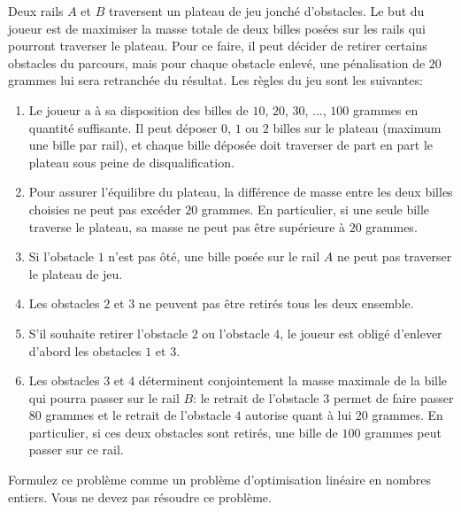 \begin{enumerate}
    Deux rails $A$ et $B$ traversent un plateau de jeu jonché
    d'obstacles.  Le but du joueur est de maximiser la masse
    totale
    de deux billes posées sur les rails qui pourront traverser le plateau.
    Pour ce faire, il peut décider de retirer
    certains obstacles du parcours, mais pour chaque obstacle
    enlevé, une pénalisation de $20$ grammes lui sera retranchée du résultat.
    Les règles du jeu sont les suivantes:
    \begin{enumerate}
      \item Le joueur a à sa disposition des billes de $10$,
        $20$, $30$, ..., $100$ grammes en quantité suffisante.  Il
        peut déposer $0$, $1$ ou $2$ billes sur le plateau
        (maximum une bille par rail), et chaque bille déposée doit
        traverser de part en part le plateau sous peine de
        disqualification.
      \item Pour assurer l'équilibre du plateau, la différence
        de masse entre les deux billes choisies ne peut pas excéder
        $20$ grammes. En particulier, si une seule bille traverse le
        plateau, sa masse ne peut pas être supérieure à $20$
        grammes.
      \item Si l'obstacle $1$ n'est pas ôté, une bille posée sur le rail $A$ ne
        peut pas traverser le plateau de jeu.
      \item Les obstacles $2$ et $3$ ne peuvent pas être retirés
        tous les deux ensemble.
      \item S'il souhaite retirer l'obstacle $2$ ou l'obstacle
        $4$, le joueur est obligé d'enlever d'abord les obstacles
        $1$ et $3$.
      \item Les obstacles $3$ et $4$ déterminent conjointement
        la masse maximale de la bille qui pourra passer sur le rail $B$: le
        retrait de l'obstacle $3$ permet de faire passer $80$
        grammes et le retrait de l'obstacle $4$ autorise quant à lui $20$
        grammes.  En particulier, si ces deux obstacles sont
        retirés, une bille de $100$ grammes peut passer sur ce
        rail.
    \end{enumerate}

    Formulez ce problème comme un problème d'optimisation linéaire
    en nombres entiers.  Vous ne devez pas résoudre ce
    problème.





\end{enumerate}
